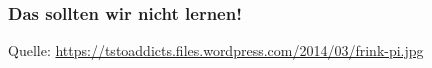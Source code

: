 \begin{frame}
\frametitle{Das sollten wir nicht lernen!}
\begin{figure}[ht]
	\centering
\end{figure}
\scriptsize{Quelle: \href{https://tstoaddicts.files.wordpress.com/2014/03/frink-pi.jpg}{\url{https://tstoaddicts.files.wordpress.com/2014/03/frink-pi.jpg}}}
\end{frame}

